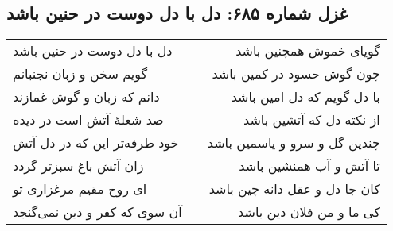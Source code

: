 \begin{center}
\section*{غزل شماره ۶۸۵: دل با دل دوست در حنین باشد}
\label{sec:0685}
\begin{longtable}{l p{0.5cm} r}
دل با دل دوست در حنین باشد
&&
گویای خموش همچنین باشد
\\
گویم سخن و زبان نجنبانم
&&
چون گوش حسود در کمین باشد
\\
دانم که زبان و گوش غمازند
&&
با دل گویم که دل امین باشد
\\
صد شعلهٔ آتش است در دیده
&&
از نکته دل که آتشین باشد
\\
خود طرفه‌تر این که در دل آتش
&&
چندین گل و سرو و یاسمین باشد
\\
زان آتش باغ سبزتر گردد
&&
تا آتش و آب همنشین باشد
\\
ای روح مقیم مرغزاری تو
&&
کان جا دل و عقل دانه چین باشد
\\
آن سوی که کفر و دین نمی‌گنجد
&&
کی ما و من فلان دین باشد
\\
\end{longtable}
\end{center}
